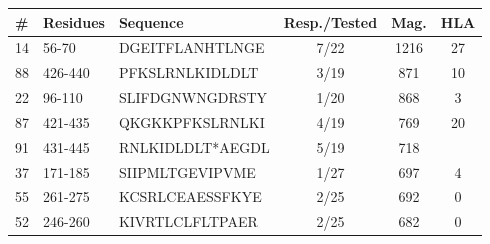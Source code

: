 \begin{tabular}{lllccc}
\toprule
\# & Residues & Sequence & Resp./Tested & Mag. & HLA \\
\midrule
14 & 56-70 & DGEITFLANHTLNGE & 7/22 & 1216 & 27 \\
88 & 426-440 & PFKSLRNLKIDLDLT & 3/19 & 871 & 10 \\
22 & 96-110 & SLIFDGNWNGDRSTY & 1/20 & 868 & 3 \\
87 & 421-435 & QKGKKPFKSLRNLKI & 4/19 & 769 & 20 \\
91 & 431-445 & RNLKIDLDLT*AEGDL & 5/19 & 718 &  \\
37 & 171-185 & SIIPMLTGEVIPVME & 1/27 & 697 & 4 \\
55 & 261-275 & KCSRLCEAESSFKYE & 2/25 & 692 & 0 \\
52 & 246-260 & KIVRTLCLFLTPAER & 2/25 & 682 & 0 \\
\bottomrule
\end{tabular}
